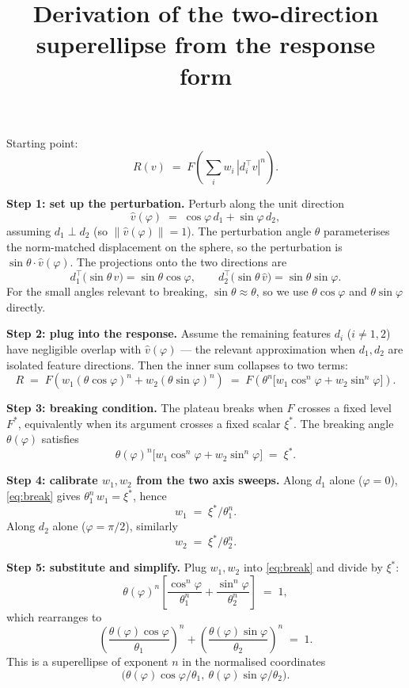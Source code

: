 \documentclass[11pt]{article}
\title{Derivation of the two-direction superellipse from the response form}
\date{}
\begin{document}
\maketitle

\noindent Starting point:
\[
R(v) \;=\; F\!\left(\sum_i w_i\, |d_i^\top v|^n\right).
\]

\medskip
\noindent\textbf{Step 1: set up the perturbation.} Perturb along the unit direction
\[
\hat v(\varphi) \;=\; \cos\varphi\, d_1 + \sin\varphi\, d_2,
\]
assuming $d_1 \perp d_2$ (so $\|\hat v(\varphi)\|=1$). The perturbation angle $\theta$ parameterises the norm-matched displacement on the sphere, so the perturbation is $\sin\theta\cdot\hat v(\varphi)$. The projections onto the two directions are
\[
d_1^\top\bigl(\sin\theta\,\hat v\bigr) = \sin\theta\cos\varphi, \qquad d_2^\top\bigl(\sin\theta\,\hat v\bigr) = \sin\theta\sin\varphi.
\]
For the small angles relevant to breaking, $\sin\theta \approx \theta$, so we use $\theta\cos\varphi$ and $\theta\sin\varphi$ directly.

\medskip
\noindent\textbf{Step 2: plug into the response.} Assume the remaining features $d_i$ ($i \neq 1,2$) have negligible overlap with $\hat v(\varphi)$ --- the relevant approximation when $d_1, d_2$ are isolated feature directions. Then the inner sum collapses to two terms:
\[
R \;=\; F\!\left(w_1 (\theta\cos\varphi)^n + w_2 (\theta\sin\varphi)^n\right)
  \;=\; F\!\left(\theta^n\bigl[w_1 \cos^n\varphi + w_2 \sin^n\varphi\bigr]\right).
\]

\medskip
\noindent\textbf{Step 3: breaking condition.} The plateau breaks when $F$ crosses a fixed level $F^*$, equivalently when its argument crosses a fixed scalar $\xi^*$. The breaking angle $\theta(\varphi)$ satisfies
\begin{equation}
\theta(\varphi)^n\bigl[w_1 \cos^n\varphi + w_2 \sin^n\varphi\bigr] \;=\; \xi^*. \label{eq:break}
\end{equation}

\medskip
\noindent\textbf{Step 4: calibrate $w_1, w_2$ from the two axis sweeps.} Along $d_1$ alone ($\varphi = 0$), \eqref{eq:break} gives $\theta_1^n\, w_1 = \xi^*$, hence
\[
w_1 \;=\; \xi^*/\theta_1^n.
\]
Along $d_2$ alone ($\varphi = \pi/2$), similarly
\[
w_2 \;=\; \xi^*/\theta_2^n.
\]

\medskip
\noindent\textbf{Step 5: substitute and simplify.} Plug $w_1, w_2$ into \eqref{eq:break} and divide by $\xi^*$:
\[
\theta(\varphi)^n\left[\frac{\cos^n\varphi}{\theta_1^n} + \frac{\sin^n\varphi}{\theta_2^n}\right] \;=\; 1,
\]
which rearranges to
\[
\boxed{\;\left(\frac{\theta(\varphi)\cos\varphi}{\theta_1}\right)^{\!n} + \left(\frac{\theta(\varphi)\sin\varphi}{\theta_2}\right)^{\!n} \;=\; 1.\;}
\]
This is a superellipse of exponent $n$ in the normalised coordinates
\[
\bigl(\theta(\varphi)\cos\varphi / \theta_1,\ \theta(\varphi)\sin\varphi / \theta_2\bigr).
\]
\end{document}
